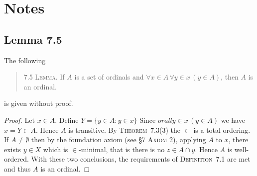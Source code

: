 
\section{Notes}

\subsection{Lemma 7.5}

The following 
\begin{quote}
  7.5 \textsc{Lemma.} If $A$ is a set of ordinals
  and \(\forall x\in A\, \forall y\in x\, (y\in A)\),
  then $A$ is an ordinal.
\end{quote}
is given without proof.
\begin{proof}
Let \(x\in A\).
Define \(Y=\{y\in A: y\in x\}\)
Since \(orall y\in x\, (y\in A)\) we have \(x=Y\subset A\).
Hence $A$ is transitive.
By \textsc{Theorem}~7.3(3) the \(\in\) is a total ordering.
If \(A\neq\emptyset\) then by the foundation axiom (see \S7 \textsc{Axiom 2}),
applying $A$ to $x$, there exists \(y\in X\)
which is \(\in\)-minimal, that is there is no \(z\in A\cap y\).
Hence $A$ is well-ordered.
With these two conclusions, the requirements of \textsc{Definition}~7.1
are met and thus $A$ is an ordinal.
\end{proof}
